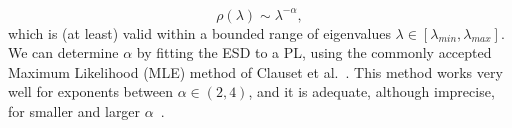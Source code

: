 \begin{equation}
\rho(\lambda)\sim\lambda^{-\alpha}  ,
\label{eqn:eigenval_pl}
\end{equation}
which is (at least) valid within a bounded range of eigenvalues $\lambda\in[\lambda_{min},\lambda_{max}]$.  
%
We can determine $\alpha$ by fitting the   ESD to a PL, using the commonly accepted Maximum Likelihood (MLE) method of Clauset et al.~\cite{CSN09_powerlaw,ABP14}.
This method works very well for exponents between $\alpha\in(2,4)$, and it is adequate, although imprecise, for smaller and larger $\alpha$~\cite{newman2005_zipf}. 



